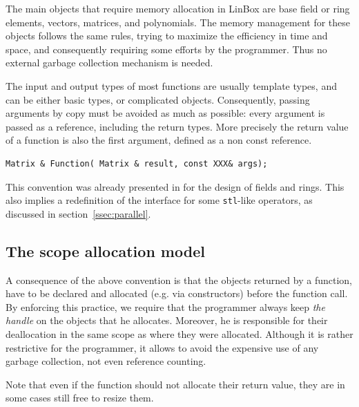 \documentclass[runningheads,a4paper]{llncs}
\newcommand{\linbox}{{\sc LinBox}\xspace}
\begin{document}
The main objects that require memory allocation in \linbox are base field or
ring elements, vectors, matrices, and polynomials.
The memory management for these objects follows the same rules, trying to
maximize the efficiency in time and space, and consequently requiring some
efforts by  the programmer. Thus no external garbage collection
mechanism is needed.

The input and output types of most functions are usually template
types, and can be either basic types, or complicated
objects. Consequently, passing arguments by copy must be avoided as
much as possible: every argument is passed as a reference, including
the return types. More precisely the return value of a function is
also the first argument, defined as a non const reference. 

\begin{verbatim}
Matrix & Function( Matrix & result, const XXX& args);
\end{verbatim}

This convention was already presented in \cite[\S 2.1]{jgd:2002:icms} for the
design of fields and rings. This also implies a redefinition of the interface
for some \texttt{stl}-like operators, as discussed in
section~\ref{ssec:parallel}.

\subsection{The scope allocation model}

A consequence of the above convention is that the objects returned by
a function,
have to be declared and allocated (e.g. via constructors) before the
function call.
By enforcing this
practice, we require that the programmer always keep 
\textit{the handle} on the
objects that he allocates. Moreover, he is responsible for their
deallocation in the same 
scope as where they were allocated. 
Although it is rather  restrictive for the
programmer, it allows to avoid the expensive use of any garbage
collection, not even reference counting.

Note that even if the function should not allocate their return value,
they are in some cases still free to resize them.
\end{document}
